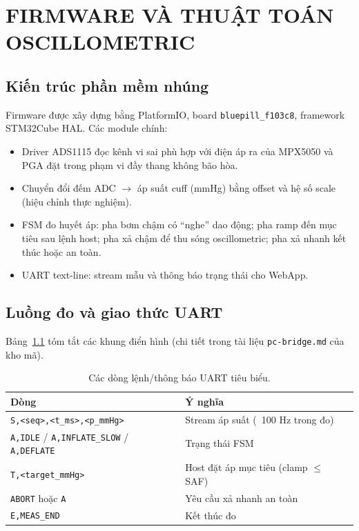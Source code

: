 \pagestyle{fancy}
\chapter{FIRMWARE VÀ THUẬT TOÁN OSCILLOMETRIC}

\section{Kiến trúc phần mềm nhúng}
Firmware được xây dựng bằng PlatformIO, board \texttt{bluepill\_f103c8}, framework STM32Cube HAL. Các module chính:
\begin{itemize}\itemsep0pt
	\item Driver ADS1115 đọc kênh vi sai phù hợp với điện áp ra của MPX5050 và PGA đặt trong phạm vi đầy thang không bão hòa.
	\item Chuyển đổi đếm ADC \(\rightarrow\) áp suất cuff (mmHg) bằng offset và hệ số scale (hiệu chỉnh thực nghiệm).
	\item FSM đo huyết áp: pha bơm chậm có ``nghe'' dao động; pha ramp đến mục tiêu sau lệnh host; pha xả chậm để thu sóng oscillometric; pha xả nhanh kết thúc hoặc an toàn.
	\item UART text-line: stream mẫu và thông báo trạng thái cho WebApp.
\end{itemize}

\section{Luồng đo và giao thức UART}
Bảng~\ref{tab:uart-frames} tóm tắt các khung điển hình (chi tiết trong tài liệu \texttt{pc-bridge.md} của kho mã).

\begin{table}[htbp]
	\centering
	\caption{Các dòng lệnh/thông báo UART tiêu biểu.}
	\label{tab:uart-frames}
	\begin{tabular}{ll}
		\hline
		\textbf{Dòng} & \textbf{Ý nghĩa} \\
		\hline
		\texttt{S,<seq>,<t\_ms>,<p\_mmHg>} & Stream áp suất (~100 Hz trong đo) \\
		\texttt{A,IDLE} / \texttt{A,INFLATE\_SLOW} / \texttt{A,DEFLATE} & Trạng thái FSM \\
		\texttt{T,<target\_mmHg>} & Host đặt áp mục tiêu (clamp \(\leq\) SAF) \\
		\texttt{ABORT} hoặc \texttt{A} & Yêu cầu xả nhanh an toàn \\
		\texttt{E,MEAS\_END} & Kết thúc đo \\
		\hline
	\end{tabular}
\end{table}

